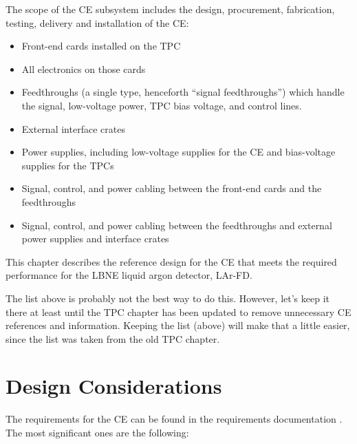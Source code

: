 The scope of the CE subsystem includes the design, procurement, fabrication, testing,
delivery and installation of the CE:
\begin{itemize}
\item Front-end cards installed on the TPC
\item All electronics on those cards
\item Feedthroughs (a single type, henceforth ``signal feedthroughs'') which handle the signal,
low-voltage power, TPC bias voltage, and control lines.
\item External interface crates
\item Power supplies, including low-voltage supplies for the CE and bias-voltage supplies for the TPCs
\item Signal, control, and power cabling between the front-end cards and the feedthroughs
\item Signal, control, and power cabling between the feedthroughs and external power supplies and interface crates
\end{itemize}
This chapter describes the reference design for the CE that meets the required performance for the LBNE liquid argon detector,
LAr-FD.
\begin{editornote}
  The list above is probably not the best way to do this.  However, let's keep it there at least until the TPC chapter has been
  updated to remove unnecessary CE references and information.  Keeping the list (above) will make that a little easier, since the
  list was taken from the old TPC chapter.
\end{editornote}

%
\section{Design Considerations} 
\label{sec:ce-reqs-n-specs}

The requirements for the CE can be found in the requirements documentation \cite{lar-fd-req}.
The most significant ones are the following:

